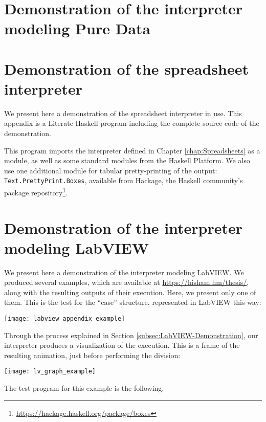 \appendix

\chapter{Demonstration of the interpreter modeling Pure Data\label{appendix:Pure-Data}}




\chapter{Demonstration of the spreadsheet interpreter\label{appendix:Spreadsheet}}


We present here a demonstration of the spreadsheet interpreter in
use. This appendix is a Literate Haskell program including the complete
source code of the demonstration.

This program imports the interpreter defined in Chapter \ref{chap:Spreadsheets}
as a module, as well as some standard modules from the Haskell Platform.
We also use one additional module for tabular pretty-printing of the
output: \texttt{Text.PrettyPrint.Boxes}, available from Hackage, the
Haskell community's package repository\footnote{\url{https://hackage.haskell.org/package/boxes}}.



\chapter{Demonstration of the interpreter modeling LabVIEW\label{appendix:LabVIEW}}


We present here a demonstration of the interpreter modeling LabVIEW.
We produced several examples, which are available at $ $\url{https://hisham.hm/thesis/},
along with the resulting outputs of their execution. Here, we present
only one of them. This is the test for the ``case'' structure, represented
in LabVIEW this way:

\begin{center}
\texttt{[image: labview\_appendix\_example]}
\par\end{center}

Through the process explained in Section \ref{subsec:LabVIEW-Demonstration},
our interpreter produces a visualization of the execution. This is
a frame of the resulting animation, just before performing the division:

\texttt{[image: lv\_graph\_example]}

The test program for this example is the following.


